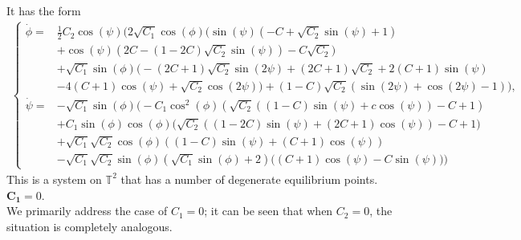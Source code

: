 \documentclass{article}
\theoremstyle{definition}
\numberwithin{equation}{section}
\begin{document}
It has the form
\begin{equation}
    \label{eq: desingularised toric}
    \begin{split}
    \begin{cases}
   \dot{\phi} =&  \frac{1}{2} C_2 \cos (\psi ) \Bigg(2 \sqrt{C_1} \cos (\phi ) \Big(\sin (\psi ) \left(-C+\sqrt{C_2} \sin (\psi )+1\right)\\&+\cos (\psi ) \left(2 C-(1-2 C) \sqrt{C_2} \sin (\psi )\right)-C \sqrt{C_2}\Big)\\&+\sqrt{C_1} \sin (\phi ) \Big(-(2 C+1) \sqrt{C_2} \sin (2 \psi )+(2 C+1) \sqrt{C_2}+2 (C+1) \sin (\psi )\\&-4 (C+1) \cos (\psi )+\sqrt{C_2} \cos (2 \psi )\Big)+(1-C) \sqrt{C_2} (\sin (2 \psi )+\cos (2 \psi )-1)\Bigg),\\
   \dot{\psi}=&-\sqrt{C_1} \sin (\phi ) \Bigg(-C_1 \cos ^2(\phi ) \left(\sqrt{C_2} ((1-C) \sin (\psi )+c \cos (\psi ))-C+1\right)\\&+C_1 \sin (\phi ) \cos (\phi ) \Big(\sqrt{C_2} ((1-2 C) \sin (\psi )+(2 C+1) \cos (\psi ))-C+1\Big)\\&+\sqrt{C_1} \sqrt{C_2} \cos (\phi ) ((1-C) \sin (\psi )+(C+1) \cos (\psi ))\\&-\sqrt{C_1} \sqrt{C_2} \sin (\phi ) \left(\sqrt{C_1} \sin (\phi )+2\right) \big((C+1) \cos (\psi )-C \sin (\psi )\big)\Bigg)
   \end{cases}
    \end{split}
\end{equation}
\noindent
This is a system on $\mathbb{T}^2$ that has a number of degenerate equilibrium points. \\
\noindent
$\mathbf{C_1}=0$. \\
We primarily address the case of $C_1=0$; it can be seen that when $C_2=0$, the situation is completely analogous.\\
\end{document}

